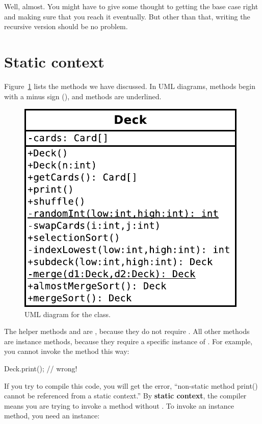 Well, almost.
You might have to give some thought to getting the base case right and making sure that you reach it eventually.
But other than that, writing the recursive version should be no problem.


\section{Static context}

Figure~\ref{fig.deck} lists the methods we have discussed.
In UML diagrams,  methods begin with a minus sign (\java{-}), and  methods are underlined.

\begin{figure}[!ht]
\begin{center}
\includegraphics{figs/deck.pdf}
\caption{UML diagram for the  class.}
\label{fig.deck}
\end{center}
\end{figure}

The helper methods  and  are , because they do not require .
All other methods are instance methods, because they require a specific instance of .
For example, you cannot invoke the  method this way:

\begin{code}
Deck.print();  // wrong!
\end{code}


If you try to compile this code, you will get the error, ``non-static method print() cannot be referenced from a static context.''
By {\bf static context}, the compiler means you are trying to invoke a method without .
To invoke an instance method, you need an instance:


